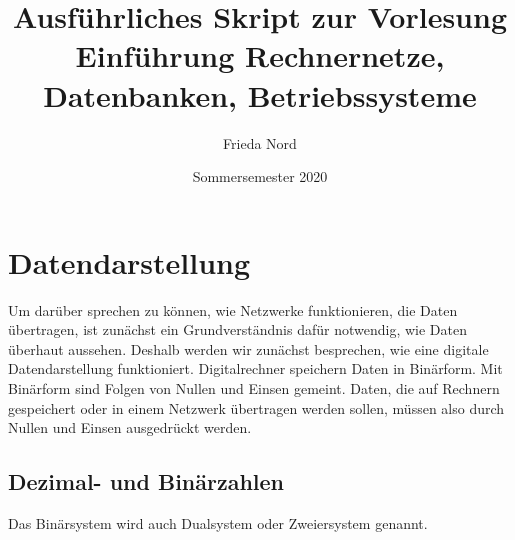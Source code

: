 \documentclass[a4paper,10pt]{article}
\title{Ausführliches Skript zur Vorlesung Einführung Rechnernetze, Datenbanken, Betriebssysteme}
\author{Frieda Nord}
\date{Sommersemester 2020}
\begin{document}
  \maketitle
  \tableofcontents

  \section{Datendarstellung}
  Um darüber sprechen zu können, wie Netzwerke funktionieren, die Daten übertragen,
  ist zunächst ein Grundverständnis dafür notwendig, wie Daten überhaut aussehen.
  Deshalb werden wir zunächst besprechen, wie eine digitale Datendarstellung
  funktioniert. Digitalrechner speichern Daten in Binärform. Mit Binärform sind
  Folgen von Nullen und Einsen gemeint. Daten, die auf Rechnern gespeichert oder
  in einem Netzwerk übertragen werden sollen, müssen also durch Nullen und Einsen
  ausgedrückt werden.

  \subsection{Dezimal- und Binärzahlen}
  Das Binärsystem wird auch Dualsystem oder Zweiersystem genannt.
\end{document}
